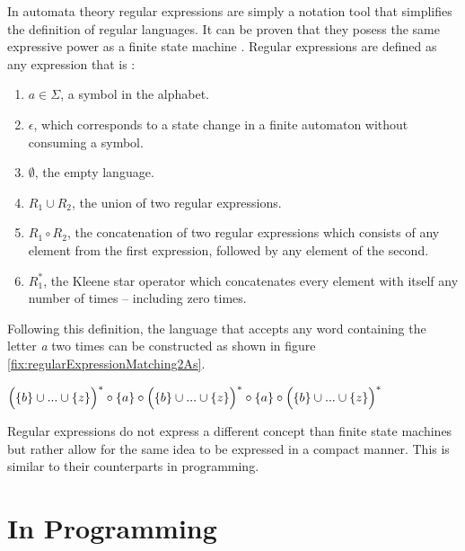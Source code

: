 In automata theory regular expressions are simply a notation tool that simplifies the definition of regular languages. It can be proven that they posess the same expressive power as a finite state machine \cite{AutomataTheoryLanguagesAndComputation}. Regular expressions are defined as any expression that is \cite[p.~46]{TheoryOfComputation}:

\begin{enumerate}
    \item $a \in \Sigma$, a symbol in the alphabet. \label{defRegexSymbol}
    \item $\epsilon$, which corresponds to a state change in a finite automaton without consuming a symbol. \label{defRegexEpsilon}
    \item $\emptyset$, the empty language. \label{defRegexEmptyLang}
    \item $R_1 \cup R_2$, the union of two regular expressions. \label{defRegexUnion}
    \item $R_1 \circ R_2$, the concatenation of two regular expressions which consists of any element from the first expression, followed by any element of the second. \label{defRegexConcat}
    \item $R_1^*$, the Kleene star operator which concatenates every element with itself any number of times -- including zero times. \label{defRegexKleene}
\end{enumerate}

Following this definition, the language that accepts any word containing the letter \emph{a} two times can be constructed as shown in figure \ref{fix:regularExpressionMatching2As}.

\begin{listingBox}[title={Regular expression that matches any word with two \emph{a}s}, label=fix:regularExpressionMatching2As,width=14cm,center]
    \hspace{-5mm}$\Bigl ( \{b\} \cup ... \cup \{z\} \Bigr )^*\circ\{a\} \circ \Bigl ( \{b\} \cup ... \cup \{z\} \Bigr )^*\circ\{a\} \circ \Bigl ( \{b\} \cup ... \cup \{z\} \Bigr )^*$
\end{listingBox}

Regular expressions do not express a different concept than finite state machines but rather allow for the same idea to be expressed in a compact manner. This is similar to their counterparts in programming.

\section{In Programming}


